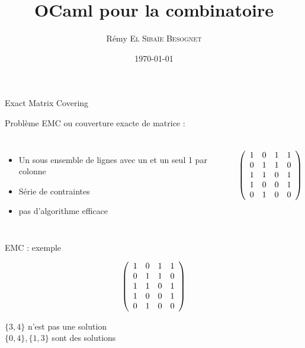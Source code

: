 \documentclass{beamer}
\begin{document}
\author{Rémy \textsc{El Sibaïe Besognet}}
\title{OCaml pour la combinatoire}
\date{\today}

\begin{frame}
  \titlepage
\end{frame}

\begin{frame}{Exact Matrix Covering}

Problème EMC ou couverture exacte de matrice :


 \begin{columns}

				\begin{itemize}
				\item Un sous ensemble de lignes avec un et un seul 1 par colonne
				\item Série de contraintes
				\item pas d'algorithme efficace
				\end{itemize}

  \begin{displaymath}
   \left(\begin{array}{ c c c c c }
   1 & 0 & 1 & 1 \\
   0 & 1 & 1 & 0 \\
   1 & 1 & 0 & 1 \\
   1 & 0 & 0 & 1 \\
   0 & 1 & 0 & 0
  \end{array}\right)
  \end{displaymath}

  \end{columns}
\end{frame}


\begin{frame}{EMC : exemple}

\begin{displaymath}
   \left(\begin{array}{ c c c c c }
   1 & 0 & 1 & 1 \\
   0 & 1 & 1 & 0 \\
   1 & 1 & 0 & 1 \\
   1 & 0 & 0 & 1 \\
   0 & 1 & 0 & 0
  \end{array}\right)
  \end{displaymath}

\begin{center}
$ \{3, 4\} $ n'est pas une solution\\
$ \{0, 4\}, \{1, 3\} $ sont des solutions
\end{center}
\end{frame}
\end{document}
